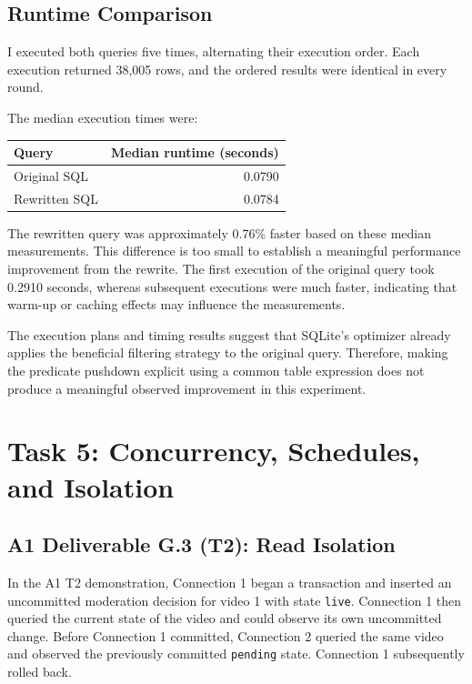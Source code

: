 \documentclass[11pt,a4paper]{article}
\begin{document}
\subsection{Runtime Comparison}

I executed both queries five times, alternating their execution
order. Each execution returned 38,005 rows, and the ordered
results were identical in every round.

The median execution times were:

\begin{center}
\begin{tabular}{lr}
\hline
Query & Median runtime (seconds) \\
\hline
Original SQL & 0.0790 \\
Rewritten SQL & 0.0784 \\
\hline
\end{tabular}
\end{center}

The rewritten query was approximately 0.76\% faster based on
these median measurements. This difference is too small to
establish a meaningful performance improvement from the rewrite.
The first execution of the original query took 0.2910 seconds,
whereas subsequent executions were much faster, indicating that
warm-up or caching effects may influence the measurements.

The execution plans and timing results suggest that SQLite's
optimizer already applies the beneficial filtering strategy to
the original query. Therefore, making the predicate pushdown
explicit using a common table expression does not produce a
meaningful observed improvement in this experiment.

\section{Task 5: Concurrency, Schedules, and Isolation}

\subsection{A1 Deliverable G.3 (T2): Read Isolation}

In the A1 T2 demonstration, Connection 1 began a transaction and
inserted an uncommitted moderation decision for video 1 with state
\texttt{live}. Connection 1 then queried the current state of the
video and could observe its own uncommitted change. Before
Connection 1 committed, Connection 2 queried the same video and
observed the previously committed \texttt{pending} state.
Connection 1 subsequently rolled back.
\end{document}
